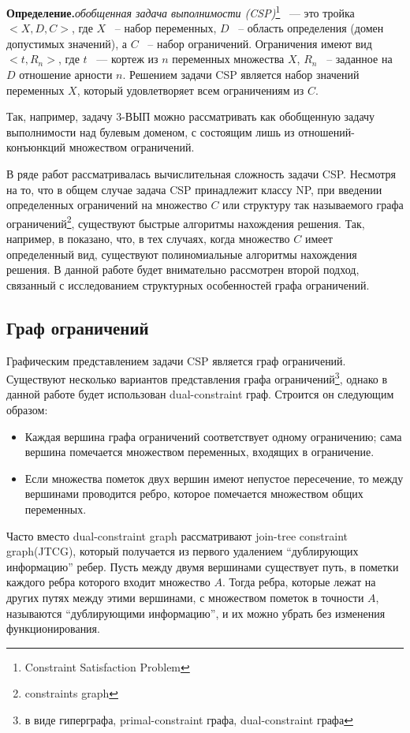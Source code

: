\documentclass[12pt]{article}
\begin{document}
\textbf{Определение.}\textit{обобщенная задача выполнимости (CSP)}\footnote{Constraint Satisfaction Problem} 
~--- это тройка $<X,D,C>$, где $X$ ~-- набор переменных, $D$ ~-- область определения (домен допустимых значений), 
а $C$ ~-- набор ограничений. Ограничения имеют вид $<t, R_n>$, где $t$ ~--- кортеж из $n$ переменных множества $X$, 
$R_n$ ~-- заданное на $D$ отношение арности $n$. 
Решением задачи CSP является набор значений переменных $X$, который удовлетворяет всем ограничениям из $C$. 

Так, например, задачу 3-ВЫП можно рассматривать как обобщенную задачу выполнимости над булевым доменом, с 
состоящим лишь из отношений-конъюнкций множеством ограничений.

В ряде работ рассматривалась вычислительная сложность задачи CSP. Несмотря на то, что в общем случае задача CSP
принадлежит классу NP, при введении определенных ограничений на множество $C$ или структуру так называемого
графа ограничений\footnote{constraints graph}, существуют быстрые алгоритмы нахождения решения. 
Так, например, в \cite{Shaeffer78} показано, 
что, в тех случаях, когда множество $C$ имеет определенный вид, существуют полиномиальные алгоритмы нахождения решения.
В данной работе будет внимательно рассмотрен второй подход, связанный с исследованием структурных особенностей 
графа ограничений. 

\subsection{Граф ограничений}
Графическим представлением задачи CSP является граф ограничений. 
Существуют несколько вариантов представления графа ограничений\cite{CSP10}\footnote
{в виде гиперграфа, primal-constraint графа, dual-constraint графа}, однако в
данной работе будет использован dual-constraint граф. Строится он следующим образом: 
\begin{itemize}
\item Каждая вершина графа ограничений соответствует одному ограничению; сама вершина помечается множеством переменных, 
входящих в ограничение.
\item Если множества пометок двух вершин имеют непустое пересечение, то между вершинами проводится ребро, которое помечается 
множеством общих переменных.
\end{itemize}

Часто вместо dual-constraint graph рассматривают join-tree constraint graph(JTCG), который получается из первого удалением 
``дублирующих информацию'' ребер. Пусть между двумя вершинами существует путь, 
в пометки каждого ребра которого входит множество $A$. Тогда ребра, которые лежат на других путях между этими вершинами, 
с множеством пометок в точности $A$, называются ``дублирующими информацию'', и их можно убрать без изменения функционирования. 
\end{document}
